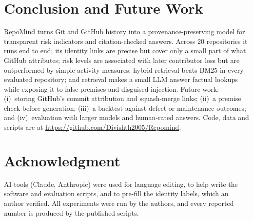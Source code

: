 \documentclass[conference]{IEEEtran}
\newcommand{\res}[1]{#1}
\begin{document}
\section{Conclusion and Future Work}
RepoMind turns Git and GitHub history into a provenance-preserving model for transparent risk indicators and citation-checked answers. Across \res{20} repositories it runs end to end; its identity links are precise but cover only a small part of what GitHub attributes; risk levels are associated with later contributor loss but are outperformed by simple activity measures; hybrid retrieval beats BM25 in every evaluated repository; and retrieval makes a small LLM answer factual lookups while exposing it to false premises and disguised injection. Future work: (i)~storing GitHub's commit attribution and squash-merge links; (ii)~a premise check before generation; (iii)~a backtest against defect or maintenance outcomes; and (iv)~evaluation with larger models and human-rated answers. Code, data and scripts are at \url{https://github.com/Divishth2005/Repomind}.

\section*{Acknowledgment}
AI tools (Claude, Anthropic) were used for language editing, to help write the software and evaluation scripts, and to pre-fill the identity labels, which an author verified. All experiments were run by the authors, and every reported number is produced by the published scripts.
\end{document}
